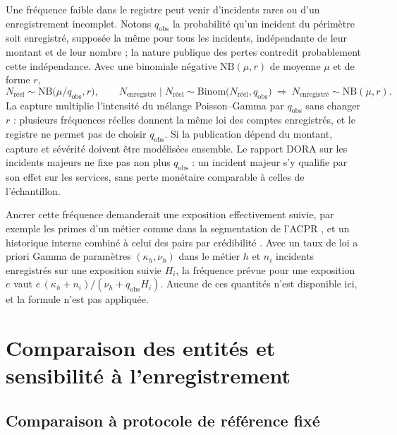 Une fréquence faible dans le registre peut venir d'incidents rares ou d'un enregistrement incomplet.
Notons $q_{\mathrm{obs}}$ la probabilité qu'un incident du périmètre soit enregistré, supposée
la même pour tous les incidents, indépendante de leur montant et de leur nombre ; la nature publique des
pertes contredit probablement cette indépendance. Avec une binomiale négative $\mathrm{NB}(\mu,r)$ de moyenne $\mu$ et de forme $r$,
\begin{equation}\label{eq:descente-capture}
N_{\text{réel}}\sim\mathrm{NB}\bigl(\mu/q_{\mathrm{obs}},r\bigr),\qquad
N_{\text{enregistré}}\mid N_{\text{réel}}\sim\mathrm{Binom}\bigl(N_{\text{réel}},q_{\mathrm{obs}}\bigr)
\ \Longrightarrow\ N_{\text{enregistré}}\sim\mathrm{NB}(\mu,r).
\end{equation}
La capture multiplie l'intensité du mélange Poisson--Gamma par $q_{\mathrm{obs}}$ sans changer $r$ :
plusieurs fréquences réelles donnent la même loi des comptes enregistrés, et le registre ne permet pas
de choisir $q_{\mathrm{obs}}$. Si la publication dépend du montant, capture et sévérité doivent être
modélisées ensemble. Le rapport DORA sur les incidents majeurs \citep{esas2026_incidents} ne fixe pas
non plus $q_{\mathrm{obs}}$ : un incident majeur s'y qualifie par son effet sur les services, sans perte
monétaire comparable à celles de l'échantillon.

Ancrer cette fréquence demanderait une exposition effectivement suivie, par exemple les primes d'un
métier comme dans la segmentation de l'ACPR \citep{ACPR2025SSI168}, et un historique interne combiné à
celui des pairs par crédibilité \citep{ShevchenkoWuthrich2006}. Avec un taux de loi a priori Gamma de
paramètres $(\kappa_h,\nu_h)$ dans le métier $h$ et $n_i$ incidents enregistrés sur une exposition
suivie $H_i$, la fréquence prévue pour une exposition $e$ vaut $e\,(\kappa_h+n_i)/(\nu_h+q_{\mathrm{obs}}H_i)$.
Aucune de ces quantités n'est disponible ici, et la formule n'est pas appliquée.

\section{Comparaison des entités et sensibilité à l'enregistrement}
\label{sec:entites-reelles}

\subsection{Comparaison à protocole de référence fixé}

